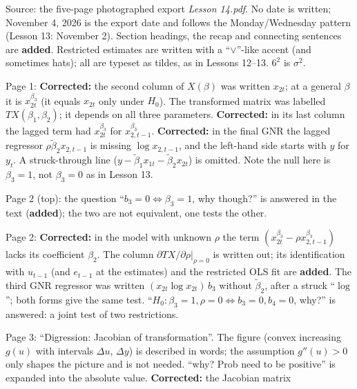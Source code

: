 \documentclass[11pt]{article}
\begin{document}
\clearpage
\begin{transcriptnotes}
 \item Source: the five-page photographed export \emph{Lesson 14.pdf}. No date is written;
       November 4, 2026 is the export date and follows the Monday/Wednesday pattern
       (Lesson 13: November 2). Section headings, the recap and connecting sentences are
       \textbf{added}. Restricted estimates are written with a ``$\vee$''-like accent (and
       sometimes hats); all are typeset as tildes, as in Lessons 12--13. $6^{2}$ is $\sigma^{2}$.
 \item Page 1: \textbf{Corrected:} the second column of $X(\beta)$ was written $x_{2t}$; at a
       general $\beta$ it is $x_{2t}^{\beta_{3}}$ (it equals $x_{2t}$ only under $H_{0}$). The
       transformed matrix was labelled $TX(\beta_{1},\beta_{2})$; it depends on all three
       parameters. \textbf{Corrected:} in its last column the lagged term had
       $x_{2t}^{\beta_{3}}$ for $x_{2,t-1}^{\beta_{3}}$. \textbf{Corrected:} in the final GNR the
       lagged regressor $\rho\tilde\beta_{2}x_{2,t-1}$ is missing $\log x_{2,t-1}$, and the left-hand
       side starts with $y$ for $y_{t}$. A struck-through line
       ($y-\tilde\beta_{1}x_{1t}-\tilde\beta_{2}x_{2t}$) is omitted. Note the null here is
       $\beta_{3}=1$, not $\beta_{3}=0$ as in Lesson 13.
 \item Page 2 (top): the question ``$b_{3}=0\Leftrightarrow\beta_{3}=1$, why though?'' is answered
       in the text (\textbf{added}); the two are not equivalent, one tests the other.
 \item Page 2: \textbf{Corrected:} in the model with unknown $\rho$ the term
       $(x_{2t}^{\beta_{3}}-\rho x_{2,t-1}^{\beta_{3}})$ lacks its coefficient $\beta_{2}$. The column
       $\partial TX/\partial\rho|_{\rho=0}$ is written out; its identification with $u_{t-1}$ (and
       $e_{t-1}$ at the estimates) and the restricted OLS fit are \textbf{added}. The third GNR
       regressor was written $(x_{2t}\log x_{2t})\,b_{3}$ without $\tilde\beta_{2}$, after a
       struck ``$\log$''; both forms give the same test. ``$H_{0}:\beta_{3}=1,\rho=0
       \Leftrightarrow b_{3}=0,b_{4}=0$, why?'' is answered: a joint test of two restrictions.
 \item Page 3: ``Digression: Jacobian of transformation''. The figure (convex increasing
       $g(u)$ with intervals $\Delta u$, $\Delta y$) is described in words; the assumption
       $g''(u)>0$ only shapes the picture and is not needed. ``why? Prob need to be
       positive'' is expanded into the absolute value. \textbf{Corrected:} the Jacobian matrix

\end{transcriptnotes}
\end{document}
